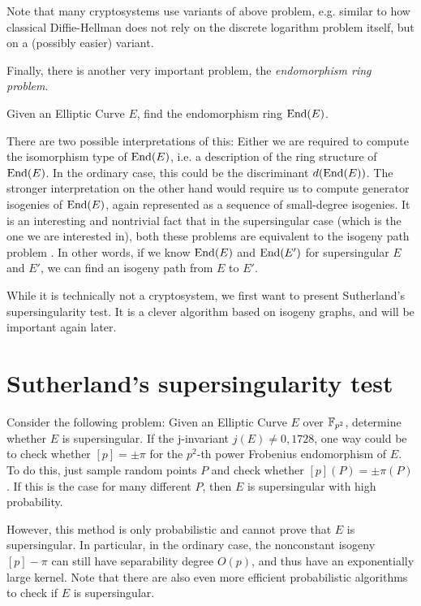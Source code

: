 Note that many cryptosystems use variants of above problem, e.g. similar to how classical Diffie-Hellman does not rely on the discrete logarithm problem itself, but on a (possibly easier) variant.

Finally, there is another very important problem, the \emph{endomorphism ring problem}.
\begin{problem}
    Given an Elliptic Curve $E$, find the endomorphism ring $\mathrm{End}(E)$.
\end{problem}
There are two possible interpretations of this:
Either we are required to compute the isomorphism type of $\mathrm{End}(E)$, i.e. a description of the ring structure of $\mathrm{End}(E)$.
In the ordinary case, this could be the discriminant $d(\mathrm{End}(E))$.
The stronger interpretation on the other hand would require us to compute generator isogenies of $\mathrm{End}(E)$, again represented as a sequence of small-degree isogenies.
It is an interesting and nontrivial fact that in the supersingular case (which is the one we are interested in), both these problems are equivalent to the isogeny path problem \cite{endomorphism_ring_isogeny_path_equivalent}.
In other words, if we know $\mathrm{End}(E)$ and $\mathrm{End}(E')$ for supersingular $E$ and $E'$, we can find an isogeny path from $E$ to $E'$.

While it is technically not a cryptosystem, we first want to present Sutherland's supersingularity test.
It is a clever algorithm based on isogeny graphs, and will be important again later.

\section{Sutherland's supersingularity test}
Consider the following problem: Given an Elliptic Curve $E$ over $\mathbb{F}_{p^2}$, determine whether $E$ is supersingular.
If the j-invariant $j(E) \neq 0, 1728$, one way could be to check whether $[p] = \pm \pi$ for the $p^2$-th power Frobenius endomorphism of $E$.
To do this, just sample random points $P$ and check whether $[p](P) = \pm \pi(P)$.
If this is the case for many different $P$, then $E$ is supersingular with high probability.

However, this method is only probabilistic and cannot prove that $E$ is supersingular.
In particular, in the ordinary case, the nonconstant isogeny $[p] - \pi$ can still have separability degree $O(p)$, and thus have an exponentially large kernel.
Note that there are also even more efficient probabilistic algorithms to check if $E$ is supersingular.


